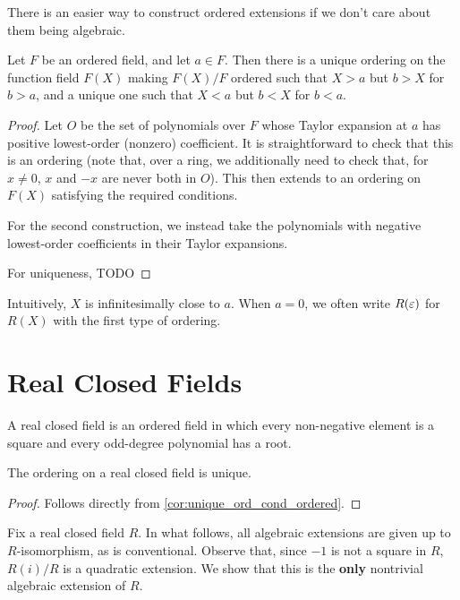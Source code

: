 There is an easier way to construct ordered extensions if we don't care about them being algebraic.

\begin{lemma}
  \label{lem:order_fun_field}
  Let $F$ be an ordered field, and let $a\in F$. Then there is a unique ordering on the function field $F(X)$ making $F(X)/F$ ordered such that $X>a$ but $b>X$ for $b>a$, and a unique one such that $X<a$ but $b<X$ for $b<a$.
\end{lemma}
\begin{proof}
  Let $O$ be the set of polynomials over $F$ whose Taylor expansion at $a$ has positive lowest-order (nonzero) coefficient. It is straightforward to check that this is an ordering (note that, over a ring, we additionally need to check that, for $x\neq0$, $x$ and $-x$ are never both in $O$). This then extends to an ordering on $F(X)$ satisfying the required conditions.

  For the second construction, we instead take the polynomials with negative lowest-order coefficients in their Taylor expansions.

  For uniqueness, TODO
\end{proof}

Intuitively, $X$ is infinitesimally close to $a$. When $a=0$, we often write $R(\varepsilon)$ for $R(X)$ with the first type of ordering.

\section{Real Closed Fields}

\begin{definition}
  \label{def:RCF}
  \leanok
  A real closed field is an ordered field in which every non-negative element is a square and every odd-degree polynomial has a root.
\end{definition}

\begin{lemma}
  \label{lem:RCF_ord_unique}
  The ordering on a real closed field is unique.
\end{lemma}
\begin{proof}
  Follows directly from \ref{cor:unique_ord_cond_ordered}.
\end{proof}

Fix a real closed field $R$. In what follows, all algebraic extensions are given up to $R$-isomorphism, as is conventional. Observe that, since $-1$ is not a square in $R$, $R(i)/R$ is a quadratic extension. We show that this is the \textbf{only} nontrivial algebraic extension of $R$.

